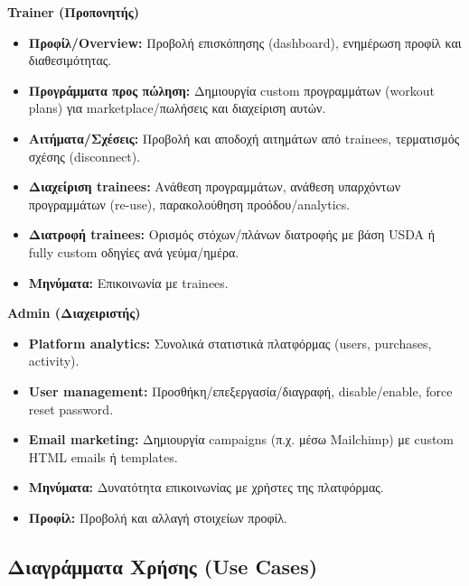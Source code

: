 \documentclass[12pt,a4paper]{report}
\begin{document}
\textbf{Trainer (Προπονητής)}
\begin{itemize}[label=•]
    \item \textbf{Προφίλ/Overview:} Προβολή επισκόπησης (dashboard), ενημέρωση προφίλ και διαθεσιμότητας.
    \item \textbf{Προγράμματα προς πώληση:} Δημιουργία custom προγραμμάτων (workout plans) για marketplace/πωλήσεις και διαχείριση αυτών.
    \item \textbf{Αιτήματα/Σχέσεις:} Προβολή και αποδοχή αιτημάτων από trainees, τερματισμός σχέσης (disconnect).
    \item \textbf{Διαχείριση trainees:} Ανάθεση προγραμμάτων, ανάθεση υπαρχόντων προγραμμάτων (re-use), παρακολούθηση προόδου/analytics.
    \item \textbf{Διατροφή trainees:} Ορισμός στόχων/πλάνων διατροφής με βάση \textenglish{USDA} ή fully custom οδηγίες ανά γεύμα/ημέρα.
    \item \textbf{Μηνύματα:} Επικοινωνία με trainees.
\end{itemize}

\textbf{Admin (Διαχειριστής)}
\begin{itemize}[label=•]
    \item \textbf{Platform analytics:} Συνολικά στατιστικά πλατφόρμας (users, purchases, activity).
    \item \textbf{User management:} Προσθήκη/επεξεργασία/διαγραφή, disable/enable, \textenglish{force reset password}.
    \item \textbf{Email marketing:} Δημιουργία campaigns (π.χ. μέσω Mailchimp) με custom HTML emails ή templates.
    \item \textbf{Μηνύματα:} Δυνατότητα επικοινωνίας με χρήστες της πλατφόρμας.
    \item \textbf{Προφίλ:} Προβολή και αλλαγή στοιχείων προφίλ.
\end{itemize}

\subsection{Διαγράμματα Χρήσης (Use Cases)}
\end{document}
